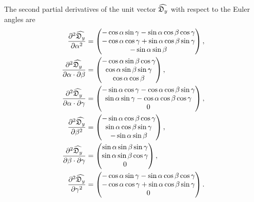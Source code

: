 The second partial derivatives of the unit vector $\widehat{\mathfrak{D}_y}$ with respect to the Euler angles are
\begin{subequations}
\begin{align}
    \frac{\partial^2 \widehat{\mathfrak{D}_y}}{\partial \alpha^2} &= \begin{pmatrix}
        -\cos \alpha \sin \gamma - \sin \alpha \cos \beta \cos \gamma \\
        -\cos \alpha \cos \gamma + \sin \alpha \cos \beta \sin \gamma \\
        -\sin \alpha \sin \beta \\
    \end{pmatrix}, \\
    \frac{\partial^2 \widehat{\mathfrak{D}_y}}{\partial \alpha \cdot \partial \beta} &= \begin{pmatrix}
        -\cos \alpha \sin \beta \cos \gamma \\
        \cos \alpha \sin \beta \sin \gamma \\
        \cos \alpha \cos \beta \\
    \end{pmatrix}, \\
    \frac{\partial^2 \widehat{\mathfrak{D}_y}}{\partial \alpha \cdot \partial \gamma} &= \begin{pmatrix}
        -\sin \alpha \cos \gamma - \cos \alpha \cos \beta \sin \gamma \\
        \sin \alpha \sin \gamma - \cos \alpha \cos \beta \cos \gamma \\
        0 \\
    \end{pmatrix}, \\
    \frac{\partial^2 \widehat{\mathfrak{D}_y}}{\partial \beta^2} &= \begin{pmatrix}
        -\sin \alpha \cos \beta \cos \gamma \\
        \sin \alpha \cos \beta \sin \gamma \\
        -\sin \alpha \sin \beta \\
    \end{pmatrix}, \\
    \frac{\partial^2 \widehat{\mathfrak{D}_y}}{\partial \beta \cdot \partial \gamma} &= \begin{pmatrix}
        \sin \alpha \sin \beta \sin \gamma \\
        \sin \alpha \sin \beta \cos \gamma \\
        0 \\
    \end{pmatrix}, \\
    \frac{\partial^2 \widehat{\mathfrak{D}_y}}{\partial \gamma^2} &= \begin{pmatrix}
        -\cos \alpha \sin \gamma - \sin \alpha \cos \beta \cos \gamma \\
        -\cos \alpha \cos \gamma + \sin \alpha \cos \beta \sin \gamma \\
        0 \\
    \end{pmatrix}.
\end{align}
\end{subequations}



